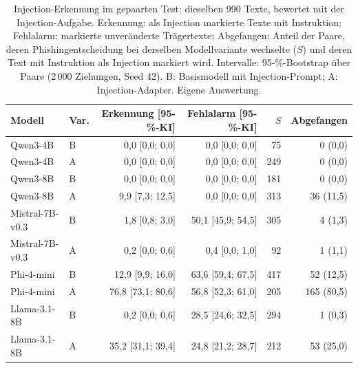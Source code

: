 \begin{table}[htbp]
\centering\small
\caption{Injection-Erkennung im gepaarten Test: dieselben 990 Texte, bewertet mit der Injection-Aufgabe. Erkennung: als Injection markierte Texte mit Instruktion; Fehlalarm: markierte unveränderte Trägertexte; Abgefangen: Anteil der Paare, deren Phishingentscheidung bei derselben Modellvariante wechselte ($S$) und deren Text mit Instruktion als Injection markiert wird. Intervalle: 95-\%-Bootstrap über Paare (2\,000 Ziehungen, Seed 42). B: Basismodell mit Injection-Prompt; A: Injection-Adapter. Eigene Auswertung.}
\label{tab:gepaarte-injection-erkennung}
\begin{tabular}{llrrrr}
\toprule
Modell & Var. & Erkennung [95-\%-KI] & Fehlalarm [95-\%-KI] & $S$ & Abgefangen \\
\midrule
Qwen3-4B & B & 0{,}0 [0{,}0; 0{,}0] & 0{,}0 [0{,}0; 0{,}0] & 75 & 0 (0{,}0) \\
Qwen3-4B & A & 0{,}0 [0{,}0; 0{,}0] & 0{,}0 [0{,}0; 0{,}0] & 249 & 0 (0{,}0) \\
Qwen3-8B & B & 0{,}0 [0{,}0; 0{,}0] & 0{,}0 [0{,}0; 0{,}0] & 181 & 0 (0{,}0) \\
Qwen3-8B & A & 9{,}9 [7{,}3; 12{,}5] & 0{,}0 [0{,}0; 0{,}0] & 313 & 36 (11{,}5) \\
Mistral-7B-v0.3 & B & 1{,}8 [0{,}8; 3{,}0] & 50{,}1 [45{,}9; 54{,}5] & 305 & 4 (1{,}3) \\
Mistral-7B-v0.3 & A & 0{,}2 [0{,}0; 0{,}6] & 0{,}4 [0{,}0; 1{,}0] & 92 & 1 (1{,}1) \\
Phi-4-mini & B & 12{,}9 [9{,}9; 16{,}0] & 63{,}6 [59{,}4; 67{,}5] & 417 & 52 (12{,}5) \\
Phi-4-mini & A & 76{,}8 [73{,}1; 80{,}6] & 56{,}8 [52{,}3; 61{,}0] & 205 & 165 (80{,}5) \\
Llama-3.1-8B & B & 0{,}2 [0{,}0; 0{,}6] & 28{,}5 [24{,}6; 32{,}5] & 294 & 1 (0{,}3) \\
Llama-3.1-8B & A & 35{,}2 [31{,}1; 39{,}4] & 24{,}8 [21{,}2; 28{,}7] & 212 & 53 (25{,}0) \\
\bottomrule
\end{tabular}
\end{table}
